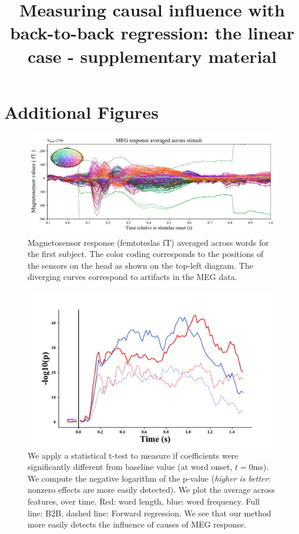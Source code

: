 \documentclass{article}
\title{Measuring causal influence with\\ back-to-back regression: the linear case - supplementary material}
\begin{document}
\appendix

\maketitle

\section{Additional Figures}

\begin{figure}[h]
  \centering
  \includegraphics[width=\textwidth, trim=0cm 0cm 0cm 0cm, clip=True]{figures/meg_sensors.pdf}
  \caption{Magnetosensor response (femtoteslas fT) averaged across words for the first subject. The color coding corresponds to the positions of the sensors on the head as shown on the top-left diagram. The diverging curves correspond to artifacts in the MEG data.}
  \label{fig:megavg}
\end{figure}


\begin{figure}[h]
  \centering
  \includegraphics[width=\textwidth, trim=0cm 0cm 0cm 0cm]{figures/pvalues.pdf}
  \caption{We apply a statistical t-test to measure if coefficients were significantly different from baseline value (at word onset, $t=0$ms).
  We compute the negative logarithm of the p-value (\textit{higher is better}: nonzero effects are more easily detected). We plot the average across features, over time. Red: word length, blue: word frequency.
  Full line: B2B, dashed line: Forward regression. We see that our method more easily detects the influence of causes of MEG response.}
\end{figure}
\end{document}
